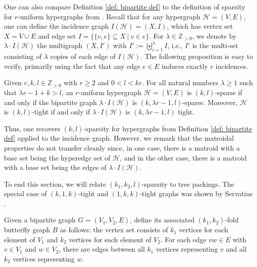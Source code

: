 \documentclass{article}
\begin{document}
One can also compare Definition \ref{def: bipartite def} to the definition of sparsity for $r$-uniform hypergraphs from \cite{STREINU20091944}. Recall that for any hypergraph $\mathcal{H}=(V,E)$, one can define the incidence graph $I(\mathcal{H}) = (X, I)$, which has vertex set $X = V\cup E$ and edge set $I=\{\{v, e\} \subseteq X ~ \vert~ v\in e\}$. For $\lambda \in \mathbb{Z}_{>0}$, we denote by $\lambda \cdot I(\mathcal{H})$ the multigraph $(X, I')$ with $I' := \biguplus_{i=1}^{\lambda} I$, i.e., $I'$ is the multi-set consisting of $\lambda$ copies of each edge of $I(\mathcal{H})$. The following proposition is easy to verify, primarily using the fact that any edge $e\in E$ induces exactly $r$ incidences. 
\begin{proposition}\label{comparison-Hyp-Inc}
    Given $r,k,l \in \mathbb{Z}_{>0}$ with $r\geq 2$ and $0 < l < k r$. For all natural numbers $\lambda\geq 1$ such that $\lambda r -1 +k >l $, an $r$-uniform hypergraph $\mathcal{H}=(V,E)$ is $(k, l)$-sparse if and only if the bipartite graph $\lambda \cdot I(\mathcal{H})$  is $(k, \lambda r-1, l)$-sparse.
    Moreover, $\mathcal{H}$ is $(k, l)$-tight if and only if $\lambda\cdot I(\mathcal{H})$ is $(k, \lambda r-1, l)$ tight.
\end{proposition}

Thus, one recovers $(k,l)$-sparsity for hypergraphs from Definition \ref{def: bipartite def} applied to the incidence graph. However, we remark that the matroidal properties do not transfer cleanly since, in one case, there is a matroid with a base set being the hyperedge set of $\mathcal{H}$, and in the other case, there is a matroid with a base set being the edges of $\lambda \cdot I(\mathcal{H})$. 

To end this section, we will relate
$(k_1,k_2,l)$-sparsity to tree packings. The special case of $(k,1,k)$-tight and $(1,k,k)$-tight graphs was shown by Servatius \cite{k-planematroids}. 

Given a bipartite graph $G=(V_1,V_2,E)$, define its associated $(k_1,k_2)$-fold butterfly graph $B$ as follows: the vertex set consists of $k_1$ vertices for each element of $V_1$ and $k_2$ vertices for each element of $V_2$. For each edge $vw \in E$ with $v\in V_1$ and $w\in V_2$, there are edges between all $k_1$ vertices representing $v$ and all $k_2$ vertices representing $w$. 
\end{document}
